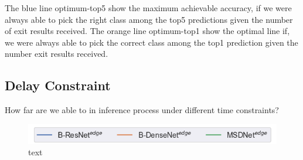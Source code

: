 The blue line optimum-top5 show the maximum achievable accuracy, if we were always able to pick the right class among the top5 predictions given the number of exit results received. The orange line optimum-top1 show the optimal line if, we were always able to pick the correct class among the top1 prediction given the number exit results received.

\subsection{Delay Constraint}

How far are we able to in inference process under different time constraints? 



\begin{figure}
	\captionsetup[subfigure]{justification=centering,farskip=1pt,captionskip=1pt}
	\centering
	\includegraphics[width=.7\linewidth]{figures/edge/offloading_legend}
	\hfill
	\caption[short text]{text}
	\label{fig:practical-offloading}
\end{figure} 


